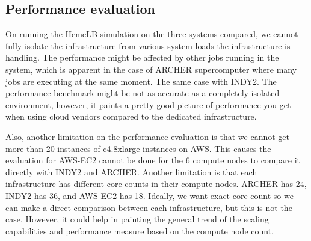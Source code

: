 \subsection{Performance evaluation}

On running the HemeLB simulation on the three systems compared, we cannot fully isolate the infrastructure from various system loads the infrastructure is handling. The performance might be affected by other jobs running in the system, which is apparent in the case of ARCHER supercomputer where many jobs are executing at the same moment. The same case with INDY2. The performance benchmark might be not as accurate as a completely isolated environment, however, it paints a pretty good picture of performance you get when using cloud vendors compared to the dedicated infrastructure. 

Also, another limitation on the performance evaluation is that we cannot get more than 20 instances of c4.8xlarge instances on AWS. This causes the evaluation for AWS-EC2 cannot be done for the 6 compute nodes to compare it directly with INDY2 and ARCHER. Another limitation is that each infrastructure has different core counts in their compute nodes. ARCHER has 24, INDY2 has 36, and AWS-EC2 has 18. Ideally, we want exact core count so we can make a direct comparison between each infrastructure, but this is not the case. However, it could help in painting the general trend of the scaling capabilities and performance measure based on the compute node count. 
